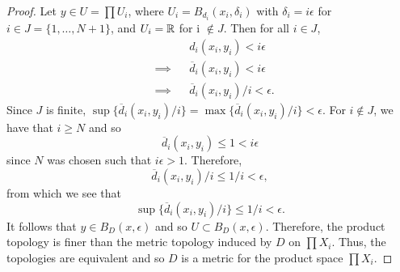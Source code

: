 \begin{solution}
\begin{proof}
    Let $y \in U = \prod U_i$, where $U_i = B_{d_i}(x_i, \delta_i)$ with $\delta_i = i \epsilon$ for $i \in J = \{1, \ldots, N + 1\}$, and $U_i = \mathbb{R}$ for i $\not\in J$.
    Then for all $i \in J$,
    \begin{equation*}
      \begin{alignedat}{2}
        &           && d_i(x_i, y_i) < i \epsilon \\
        & \implies  && \overline{d}_i(x_i, y_i) < i \epsilon \\
        & \implies  && \overline{d}_i(x_i, y_i) / i < \epsilon.
      \end{alignedat}
    \end{equation*}
    Since $J$ is finite, $\sup\{\overline{d}_i(x_i, y_i) / i\} = \max\{\overline{d}_i(x_i, y_i) / i\} < \epsilon$.
    For $i \not\in J$, we have that $i \geq N$ and so
    \begin{equation*}
        \overline{d}_i(x_i, y_i) \leq 1 < i \epsilon
    \end{equation*}
    since $N$ was chosen such that $i \epsilon > 1$.
    Therefore,
    \begin{equation*}
      \overline{d}_i(x_i, y_i) / i \leq 1 / i < \epsilon,
    \end{equation*}
    from which we see that
    \begin{equation*}
      \sup\{\overline{d}_i(x_i, y_i) / i\} \leq 1 / i < \epsilon.
    \end{equation*}
    It follows that $y \in B_D(x, \epsilon)$ and so $U \subset B_D(x, \epsilon)$.
    Therefore, the product topology is finer than the metric topology induced by $D$ on $\prod X_i$.
    Thus, the topologies are equivalent and so $D$ is a metric for the product space $\prod X_i$.
  \end{proof}
\end{solution}

